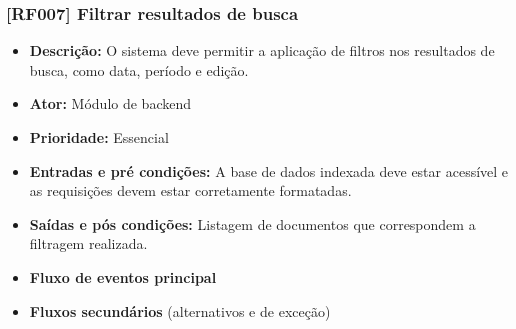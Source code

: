  \subsubsection{[RF007] Filtrar resultados de busca}
\begin{itemize}
   \item \textbf{Descrição:} O sistema deve permitir a aplicação de filtros nos resultados de busca, como data, período e edição.
   \item \textbf{Ator:} Módulo de backend
   \item \textbf{Prioridade:} Essencial
   \item \textbf{Entradas e pré condições:} A base de dados indexada deve estar acessível e as requisições devem estar corretamente formatadas.
   \item \textbf{Saídas e pós condições:} Listagem de documentos que correspondem a filtragem realizada.
   \item \textbf{Fluxo de eventos principal}
   \item \textbf{Fluxos secundários} (alternativos e de exceção)
 \end{itemize}

